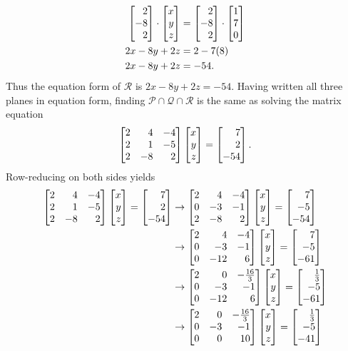 \begin{exercises}
\begin{problist}
\begin{solution}
\begin{align*}
				\mat{2\\-8\\2}\cdot \mat{x\\y\\z}&=\mat{2\\-8\\2}\cdot\mat{1\\7\\0}\\
				2x-8y+2z&=2-7(8)\\
				2x-8y+2z&=-54.
			\end{align*}
			Thus the equation form of $\mathcal{R}$ is $2x-8y+2z=-54$.
			Having written all three planes in equation form, finding $\mathcal{P}\cap\mathcal{Q}\cap\mathcal{R}$ is the same as 
			solving the matrix equation \[\mat{2&4&-4\\2&1&-5\\2&-8&2}\mat{x\\y\\z}=\mat{7\\2\\-54}.\] Row-reducing on both sides yields 
			\begin{align*}
				\mat{2&4&-4\\2&1&-5\\2&-8&2}\mat{x\\y\\z}=\mat{7\\2\\-54}&\rightarrow \mat{2&4&-4\\0&-3&-1\\2&-8&2}\mat{x\\y\\z}=\mat{7\\-5\\-54}\\
				&\rightarrow \mat{2&4&-4\\0&-3&-1\\0&-12&6}\mat{x\\y\\z}=\mat{7\\-5\\-61}\\
				&\rightarrow \mat{2&0&-\frac{16}{3}\\0&-3&-1\\0&-12&6}\mat{x\\y\\z}=\mat{\frac{1}{3}\\-5\\-61}\\
				&\rightarrow \mat{2&0&-\frac{16}{3}\\0&-3&-1\\0&0&10}\mat{x\\y\\z}=\mat{\frac{1}{3}\\-5\\-41}\\

\end{align*}
\end{solution}
\end{problist}
\end{exercises}

